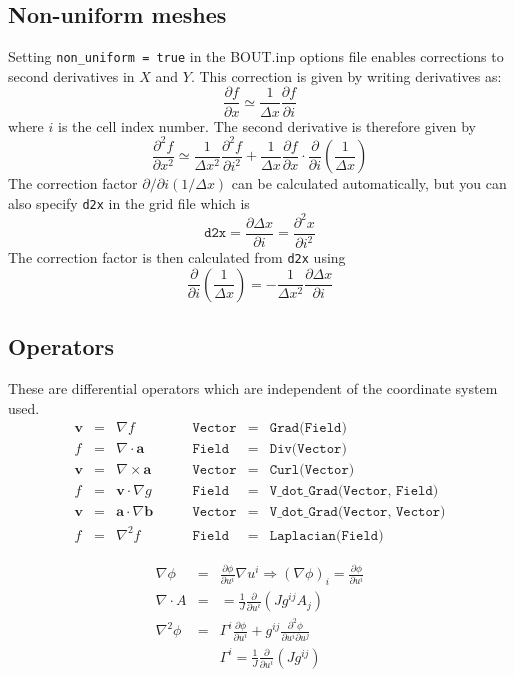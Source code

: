 \documentclass[12pt]{article}
\newcommand{\code}[1]{\texttt{#1}}
\newcommand{\deriv}[2]{\ensuremath{\frac{\partial #1}{\partial #2}}}
\begin{document}
\subsection{Non-uniform meshes}
Setting \texttt{non\_uniform = true} in the BOUT.inp options file
enables corrections to second derivatives in $X$ and $Y$. This correction
is given by writing derivatives as:
\[
\deriv{f}{x} \simeq \frac{1}{\Delta x} \deriv{f}{i}
\]
where $i$ is the cell index number. The second derivative is therefore given by
\[
\frac{\partial^2 f}{\partial x^2} \simeq \frac{1}{\Delta x^2}\frac{\partial^2 f}{\partial i^2} + \frac{1}{\Delta x}\deriv{f}{x} \cdot \deriv{}{i}\left(\frac{1}{\Delta x}\right)
\]
The correction factor $\partial/\partial i\left(1/\Delta x\right)$ can be
calculated automatically, but you can also specify \texttt{d2x} in the grid file which is
\[
\texttt{d2x} = \deriv{\Delta x}{i} = \frac{\partial^2 x}{\partial i^2}
\]
The correction factor is then calculated from \texttt{d2x} using
\[
\deriv{}{i}\left(\frac{1}{\Delta x}\right) = -\frac{1}{\Delta x^2} \deriv{\Delta x}{i}
\]


\subsection{Operators}

These are differential operators which are independent of the coordinate system used.
\[
\begin{array}{rclrcl}
\mathbf{v} &=& \nabla f &\qquad \code{Vector} &=& \code{Grad(Field)} \\
f &=& \nabla\cdot\mathbf{a} &\qquad \code{Field} &=& \code{Div(Vector)} \\
\mathbf{v} &=& \nabla\times\mathbf{a} &\qquad \code{Vector} &=& \code{Curl(Vector)} \\
f &=& \mathbf{v}\cdot\nabla g &\qquad \code{Field} &=& \code{V\_dot\_Grad(Vector, Field)} \\
\mathbf{v} &=& \mathbf{a}\cdot\nabla\mathbf{b} &\qquad \code{Vector} &=& \code{V\_dot\_Grad(Vector, Vector)} \\
f &=& \nabla^2 f &\qquad \code{Field} &=& \code{Laplacian(Field)}
\end{array}
\]

\begin{eqnarray*}
\nabla\phi &=& \deriv{\phi}{u^i}\nabla u^i \Rightarrow \left(\nabla\phi\right)_i = \deriv{\phi}{u^i} \\
\nabla\cdot A &=& = \frac{1}{J}\deriv{}{u^i}\left(Jg^{ij}A_j\right) \\
\nabla^2\phi &=& \Gamma^i\deriv{\phi}{u^i} + g^{ij}\frac{\partial^2\phi}{\partial u^i\partial u^j} \\
& &\Gamma^i = \frac{1}{J}\deriv{}{u^i}\left(Jg^{ij}\right)
\end{eqnarray*}
\end{document}
